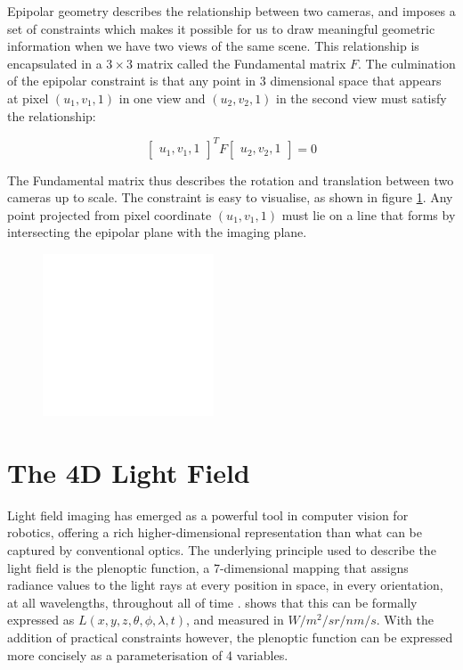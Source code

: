 \documentclass[openany]{book}
\begin{document}
Epipolar geometry describes the relationship between two cameras, and imposes a set of constraints which makes it possible for us to draw meaningful geometric information when we have two views of the same scene. This relationship is encapsulated in a $3 \times 3$ matrix called the Fundamental matrix $F$. The culmination of the epipolar constraint is that any point in 3 dimensional space that appears at pixel $(u_1, v_1, 1)$ in one view and $(u_2, v_2, 1)$ in the second view must satisfy the relationship:

\begin{equation}
    \begin{bmatrix}
        u_1, v_1, 1
    \end{bmatrix}^T
    F
    \begin{bmatrix}
        u_2, v_2, 1
    \end{bmatrix}
    = 0
\end{equation}

The Fundamental matrix thus describes the rotation and translation between two cameras up to scale. The constraint is easy to visualise, as shown in figure \ref{epipolarplane}. Any point projected from pixel coordinate $(u_1, v_1, 1)$ must lie on a line that forms by intersecting the epipolar plane with the imaging plane. 

\begin{figure}
    \includegraphics[width=2in]{images/blank.png}
    \label{epipolarplane}
\end{figure}


\section{The 4D Light Field}
Light field imaging has emerged as a powerful tool in computer vision for robotics, offering a rich higher-dimensional representation than what can be captured by conventional optics. The underlying principle used to describe the light field is the plenoptic function, a 7-dimensional mapping that assigns radiance values to the light rays at every position in space, in every orientation, at all wavelengths, throughout all of time \cite{ihrke2016lfprinciples}. \cite{adelson1991plenoptic} shows that this can be formally expressed as $L(x,y,z,\theta, \phi, \lambda, t)$, and measured in $W/m^2/sr/nm/s$. 
With the addition of practical constraints however, the plenoptic function can be expressed more concisely as a parameterisation of 4 variables. 
\end{document}

